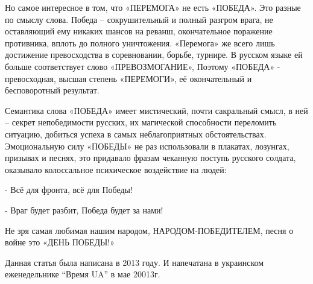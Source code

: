 Но самое интересное в том, что «ПЕРЕМОГА» не есть «ПОБЕДА». Это разные по
смыслу слова. Победа – сокрушительный и полный разгром врага, не оставляющий
ему никаких шансов на реванш, окончательное поражение противника, вплоть до
полного уничтожения. «Перемога» же всего лишь достижение превосходства в
соревновании, борьбе, турнире. В русском языке ей больше соответствует слово
«ПРЕВОЗМОГАНИЕ», Поэтому «ПОБЕДА» - превосходная, высшая степень «ПЕРЕМОГИ», её
окончательный и бесповоротный результат.

Семантика слова «ПОБЕДА» имеет мистический, почти сакральный смысл, в ней –
секрет непобедимости русских, их магической способности переломить ситуацию,
добиться успеха  в самых неблагоприятных обстоятельствах. Эмоциональную  силу
«ПОБЕДЫ» не раз использовали в плакатах, лозунгах, призывах и песнях, это
придавало фразам чеканную поступь русского солдата, оказывало колоссальное
психическое воздействие на людей:

- Всё для  фронта, всё для Победы!

- Враг будет разбит, Победа будет за нами!

Не зря самая любимая нашим народом, НАРОДОМ-ПОБЕДИТЕЛЕМ, песня о войне это
«ДЕНЬ ПОБЕДЫ!»

Данная статья была написана в 2013 году. И напечатана в украинском
еженедельнике \enquote{Время UA} в мае 20013г. 

